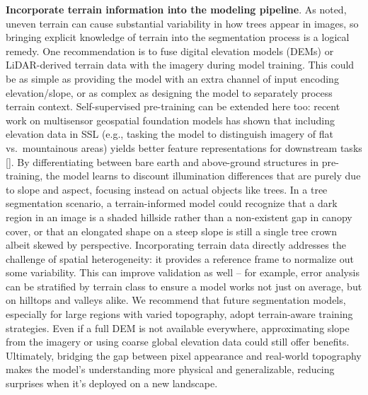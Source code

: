 \documentclass[runningheads]{llncs}
\begin{document}
\textbf{Incorporate terrain information into the modeling pipeline}. As
noted, uneven terrain can cause substantial variability in how trees
appear in images, so bringing explicit knowledge of terrain into the
segmentation process is a logical remedy. One recommendation is to fuse
digital elevation models (DEMs) or LiDAR-derived terrain data with the
imagery during model training. This could be as simple as providing the
model with an extra channel of input encoding elevation/slope, or as
complex as designing the model to separately process terrain context.
Self-supervised pre-training can be extended here too: recent work on
multisensor geospatial foundation models has shown that including
elevation data in SSL (e.g., tasking the model to distinguish imagery of
flat vs.~mountainous areas) yields better feature representations for
downstream tasks {[}\cite{han2024msGFM}{]}. By differentiating between
bare earth and above-ground structures in pre-training, the model learns
to discount illumination differences that are purely due to slope and
aspect, focusing instead on actual objects like trees. In a tree
segmentation scenario, a terrain-informed model could recognize that a
dark region in an image is a shaded hillside rather than a non-existent
gap in canopy cover, or that an elongated shape on a steep slope is
still a single tree crown albeit skewed by perspective. Incorporating
terrain data directly addresses the challenge of spatial heterogeneity:
it provides a reference frame to normalize out some variability. This
can improve validation as well -- for example, error analysis can be
stratified by terrain class to ensure a model works not just on average,
but on hilltops and valleys alike. We recommend that future segmentation
models, especially for large regions with varied topography, adopt
terrain-aware training strategies. Even if a full DEM is not available
everywhere, approximating slope from the imagery or using coarse global
elevation data could still offer benefits. Ultimately, bridging the gap
between pixel appearance and real-world topography makes the model's
understanding more physical and generalizable, reducing surprises when
it's deployed on a new landscape.
\end{document}
